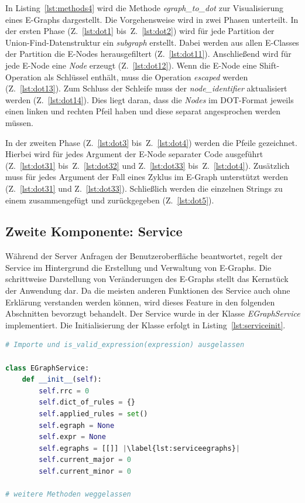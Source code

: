 In Listing~\ref{lst:methods4} wird die Methode \textit{egraph\_to\_dot} zur Visualisierung eines E-Graphs dargestellt. Die Vorgehensweise wird in zwei Phasen unterteilt.
In der ersten Phase (Z.~\ref{lst:dot1} bis~Z.~\ref{lst:dot2}) wird für jede Partition der Union-Find-Datenstruktur ein \textit{subgraph} erstellt. Dabei werden aus allen
E-Classes der Partition die E-Nodes herausgefiltert (Z.~\ref{lst:dot11}). Anschließend wird für jede E-Node eine \textit{Node} erzeugt (Z.~\ref{lst:dot12}).
Wenn die E-Node eine Shift-Operation als Schlüssel enthält, muss die Operation \textit{escaped} werden (Z.~\ref{lst:dot13}).
Zum Schluss der Schleife muss der \textit{node\_identifier} aktualisiert werden (Z.~\ref{lst:dot14}). Dies liegt daran, dass die \textit{Nodes} im DOT-Format
jeweils einen linken und rechten Pfeil haben und diese separat angesprochen werden müssen.

In der zweiten Phase (Z.~\ref{lst:dot3} bis~Z.~\ref{lst:dot4}) werden die Pfeile gezeichnet. 
Hierbei wird für jedes Argument der E-Node separater Code ausgeführt (Z.~\ref{lst:dot31} bis~Z.~\ref{lst:dot32} und Z.~\ref{lst:dot33} bis~Z.~\ref{lst:dot4}).
Zusätzlich muss für jedes Argument der Fall eines Zyklus im E-Graph unterstützt werden (Z.~\ref{lst:dot31} und Z.~\ref{lst:dot33}).
Schließlich werden die einzelnen Strings zu einem zusammengefügt und zurückgegeben (Z.~\ref{lst:dot5}). 

\subsection{Zweite Komponente: Service}

Während der Server Anfragen der Benutzeroberfläche beantwortet, regelt der Service im Hintergrund die Erstellung und Verwaltung von E-Graphs.
Die schrittweise Darstellung von Veränderungen des E-Graphs stellt das Kernstück der Anwendung dar. 
Da die meisten anderen Funktionen des Service auch ohne Erklärung verstanden werden können, wird dieses Feature in den folgenden Abschnitten bevorzugt behandelt.
Der Service wurde in der Klasse \textit{EGraphService} implementiert. Die Initialisierung der Klasse erfolgt in Listing~\ref{lst:serviceinit}.

\begin{lstlisting}[language=Python, escapechar=|, caption=Auszug aus der Datei \textit{EGraphService.py}, label={lst:serviceinit}]
# Importe und is_valid_expression(expression) ausgelassen 

class EGraphService:
    def __init__(self):
        self.rrc = 0
        self.dict_of_rules = {}
        self.applied_rules = set()
        self.egraph = None
        self.expr = None
        self.egraphs = [[]] |\label{lst:serviceegraphs}|
        self.current_major = 0
        self.current_minor = 0

# weitere Methoden weggelassen
\end{lstlisting} 

